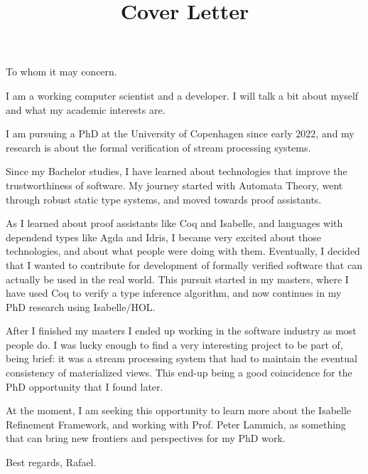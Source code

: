 \documentclass[11pt,a4paper,sans]{moderncv}
\title{Cover Letter}
\begin{document}
\makecvtitle %
To whom it may concern.

\medskip

I am a working computer scientist and a developer.
I will talk a bit about myself and what my academic interests are.

\medskip
I am pursuing a PhD at the University of Copenhagen since early 2022, and my research is about the formal verification of stream processing systems.

Since my Bachelor studies, I have learned about technologies that improve the trustworthiness of software.
My journey started with Automata Theory, went through robust static type systems, and moved towards proof assistants.

\medskip
As I learned about proof assistants like Coq and Isabelle, and languages with dependend types like Agda and Idris, I became very excited about those technologies, and about what people were doing with them.
Eventually, I decided that I wanted to contribute for development of formally verified software that can actually be used in the real world.
This pursuit started in my masters, where I have used Coq to verify a type inference algorithm, and now continues in my PhD research using Isabelle/HOL.

\medskip
After I finished my masters I ended up working in the software industry as most people do.
I was lucky enough to find a very interesting project to be part of, being brief: it was a stream processing system that had to maintain the eventual consistency of materialized views.
This end-up being a good coincidence for the PhD opportunity that I found later.

\medskip
At the moment, I am seeking this opportunity to learn more about the Isabelle Refinement Framework, and working with Prof. Peter Lammich, as something that can bring new frontiers and perspectives for my PhD work.

\medskip
Best regards, Rafael.
\end{document}
